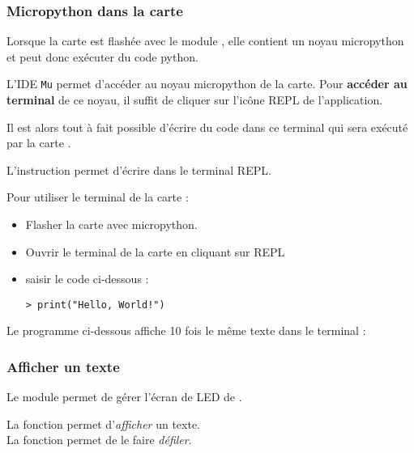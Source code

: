 \subsubsection{Micropython dans la carte \mb}

Lorsque la carte \mb est flashée avec le module , elle contient un noyau micropython et peut donc exécuter du code python.

L'IDE \texttt{Mu} permet d'accéder au noyau micropython de la carte. Pour \textbf{accéder au terminal} de ce noyau, il suffit de cliquer sur l'icône REPL de l'application.

Il est alors tout à fait possible d'écrire du code dans ce terminal qui sera exécuté par la carte \mb.

\begin{remarque}
    L'instruction  permet d'écrire dans le terminal REPL.
\end{remarque}

\begin{methode}
Pour utiliser le terminal de la carte \mb :
\begin{itemize}
    \item Flasher la carte \mb avec micropython.
    \item Ouvrir le terminal de la carte en cliquant sur REPL
    \item saisir le code ci-dessous :\\
\begin{verbatim}
> print("Hello, World!")
\end{verbatim}
\end{itemize}
\end{methode}

\begin{methode}
    Le programme ci-dessous affiche 10 fois le même texte dans le terminal :
\end{methode}


\subsubsection{Afficher un texte}

Le module  permet de gérer l'écran de LED de \mb.\par
La fonction  permet d'\emph{afficher} un texte.\\
La fonction  permet de le faire \emph{défiler}.

